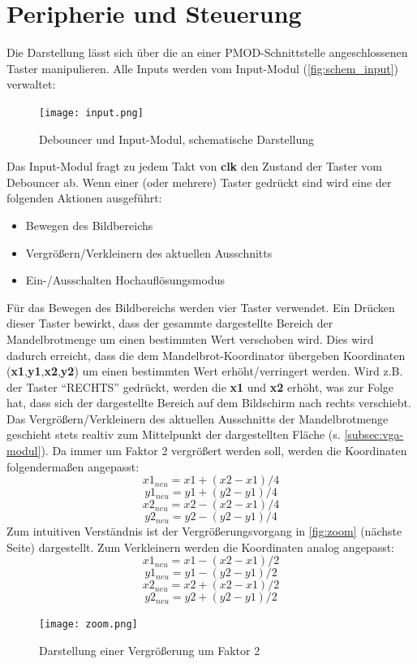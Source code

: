 \documentclass[a4paper,12pt,onesided]{report}
\begin{document}
\section{Peripherie und Steuerung}
\label{sec:peripheriesteuerung}
Die Darstellung lässt sich über die an einer PMOD-Schnittstelle angeschlossenen Taster manipulieren.
Alle Inputs werden vom Input-Modul (\autoref{fig:schem_input}) verwaltet:
\begin{figure}[H]
	\centering
	\texttt{[image: input.png]}
	\caption{Debouncer und Input-Modul, schematische Darstellung}
	\label{fig:schem_input}
\end{figure}
Das Input-Modul fragt zu jedem Takt von \textbf{clk} den Zustand der Taster vom Debouncer ab.
Wenn einer (oder mehrere) Taster gedrückt sind wird eine der folgenden Aktionen ausgeführt:
\begin{itemize}
	\item Bewegen des Bildbereichs
	\item Vergrößern/Verkleinern des aktuellen Ausschnitts
	\item Ein-/Ausschalten Hochauflösungsmodus
\end{itemize}
Für das Bewegen des Bildbereichs werden vier Taster verwendet.
Ein Drücken dieser Taster bewirkt, dass der gesammte dargestellte Bereich der Mandelbrotmenge um einen bestimmten Wert verschoben wird.
Dies wird dadurch erreicht, dass die dem Mandelbrot-Koordinator übergeben Koordinaten (\textbf{x1},\textbf{y1},\textbf{x2},\textbf{y2}) um einen bestimmten Wert erhöht/verringert werden.
Wird z.B. der Taster "`RECHTS"' gedrückt, werden die \textbf{x1} und \textbf{x2} erhöht, was zur Folge hat, dass sich der dargestellte Bereich auf dem Bildschirm nach rechts verschiebt.\\
Das Vergrößern/Verkleinern des aktuellen Ausschnitts der Mandelbrotmenge geschieht stets realtiv zum Mittelpunkt der dargestellten Fläche (s. \autoref{subsec:vga-modul}).
Da immer um Faktor 2 vergrößert werden soll, werden die Koordinaten folgendermaßen angepasst:
\[x1_{neu} = x1 + (x2-x1)/4\]
\[y1_{neu} = y1 + (y2-y1)/4\]
\[x2_{neu} = x2 - (x2-x1)/4\]
\[y2_{neu} = y2 - (y2-y1)/4\]
Zum intuitiven Verständnis ist der Vergrößerungsvorgang in \autoref{fig:zoom} (nächste Seite) %
dargestellt.
Zum Verkleinern werden die Koordinaten analog angepasst:
\[x1_{neu} = x1 - (x2-x1)/2\]
\[y1_{neu} = y1 - (y2-y1)/2\]
\[x2_{neu} = x2 + (x2-x1)/2\]
\[y2_{neu} = y2 + (y2-y1)/2\]
\begin{figure}[H]
	\centering
	\texttt{[image: zoom.png]}
	\caption{Darstellung einer Vergrößerung um Faktor 2}
	\label{fig:zoom}
\end{figure}
\end{document}
